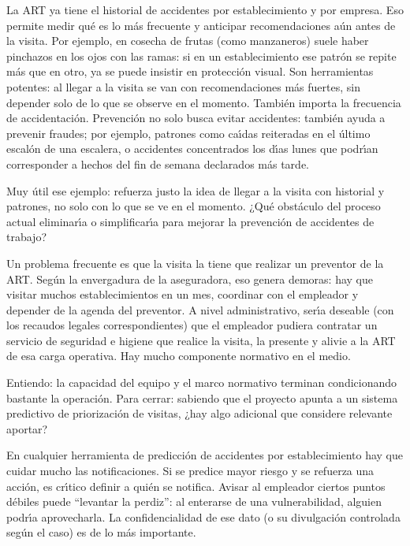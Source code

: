 \begin{description}[style=nextline, leftmargin=0cm, labelsep=0.35cm]
\item[\textbf{Entrevistado:}]
La ART ya tiene el historial de accidentes por establecimiento y por empresa.
Eso permite medir qu\'e es lo m\'as frecuente y anticipar recomendaciones a\'un antes de la visita.
Por ejemplo, en cosecha de frutas (como manzaneros) suele haber pinchazos en los ojos con las ramas: si en un establecimiento ese patr\'on se repite m\'as que en otro, ya se puede insistir en protecci\'on visual.
Son herramientas potentes: al llegar a la visita se van con recomendaciones m\'as fuertes, sin depender solo de lo que se observe en el momento.
Tambi\'en importa la frecuencia de accidentaci\'on.
Prevenci\'on no solo busca evitar accidentes: tambi\'en ayuda a prevenir fraudes; por ejemplo, patrones como ca\'{\i}das reiteradas en el \'ultimo escal\'on de una escalera, o accidentes concentrados los d\'{\i}as lunes que podr\'{\i}an corresponder a hechos del fin de semana declarados m\'as tarde.

\item[\textbf{Entrevistador:}]
Muy \'util ese ejemplo: refuerza justo la idea de llegar a la visita con historial y patrones, no solo con lo que se ve en el momento.
¿Qu\'e obst\'aculo del proceso actual eliminar\'{\i}a o simplificar\'{\i}a para mejorar la prevenci\'on de accidentes de trabajo?

\item[\textbf{Entrevistado:}]
Un problema frecuente es que la visita la tiene que realizar un preventor de la ART.
Seg\'un la envergadura de la aseguradora, eso genera demoras: hay que visitar muchos establecimientos en un mes, coordinar con el empleador y depender de la agenda del preventor.
A nivel administrativo, ser\'{\i}a deseable (con los recaudos legales correspondientes) que el empleador pudiera contratar un servicio de seguridad e higiene que realice la visita, la presente y alivie a la ART de esa carga operativa.
Hay mucho componente normativo en el medio.

\item[\textbf{Entrevistador:}]
Entiendo: la capacidad del equipo y el marco normativo terminan condicionando bastante la operaci\'on.
Para cerrar: sabiendo que el proyecto apunta a un sistema predictivo de priorizaci\'on de visitas, ¿hay algo adicional que considere relevante aportar?

\item[\textbf{Entrevistado:}]
En cualquier herramienta de predicci\'on de accidentes por establecimiento hay que cuidar mucho las notificaciones.
Si se predice mayor riesgo y se refuerza una acci\'on, es cr\'{\i}tico definir a qui\'en se notifica.
Avisar al empleador ciertos puntos d\'ebiles puede ``levantar la perdiz'': al enterarse de una vulnerabilidad, alguien podr\'{\i}a aprovecharla.
La confidencialidad de ese dato (o su divulgaci\'on controlada seg\'un el caso) es de lo m\'as importante.


\end{description}
